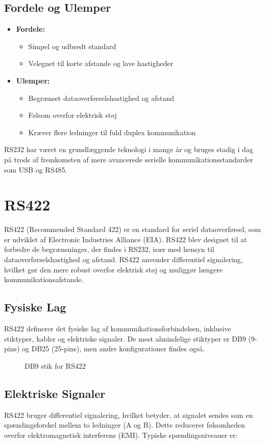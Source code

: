 \subsection{Fordele og Ulemper}
\begin{itemize}
	\item \textbf{Fordele:}
	\begin{itemize}
		\item Simpel og udbredt standard
		\item Velegnet til korte afstande og lave hastigheder
	\end{itemize}
	\item \textbf{Ulemper:}
	\begin{itemize}
		\item Begrænset dataoverførselshastighed og afstand
		\item Følsom overfor elektrisk støj
		\item Kræver flere ledninger til fuld duplex kommunikation
	\end{itemize}
\end{itemize}
RS232 har været en grundlæggende teknologi i mange år og bruges stadig i dag på trods af fremkomsten af mere avancerede serielle kommunikationsstandarder som USB og RS485.

\section{RS422}
RS422 (Recommended Standard 422) er en standard for seriel dataoverførsel, som er udviklet af Electronic Industries Alliance (EIA). RS422 blev designet til at forbedre de begrænsninger, der findes i RS232, især med hensyn til dataoverførselshastighed og afstand. RS422 anvender differentiel signalering, hvilket gør den mere robust overfor elektrisk støj og muliggør længere kommunikationsafstande.

\subsection{Fysiske Lag}
RS422 definerer det fysiske lag af kommunikationsforbindelsen, inklusive stiktyper, kabler og elektriske signaler. De mest almindelige stiktyper er DB9 (9-pins) og DB25 (25-pins), men andre konfigurationer findes også.
\begin{figure}[h]
	\centering
	
	\caption{DB9 stik for RS422}
	\label{fig:rs422_connector}
\end{figure}

\subsection{Elektriske Signaler}
RS422 bruger differentiel signalering, hvilket betyder, at signalet sendes som en spændingsforskel mellem to ledninger (A og B). Dette reducerer følsomheden overfor elektromagnetisk interferens (EMI). Typiske spændingsniveauer er:

